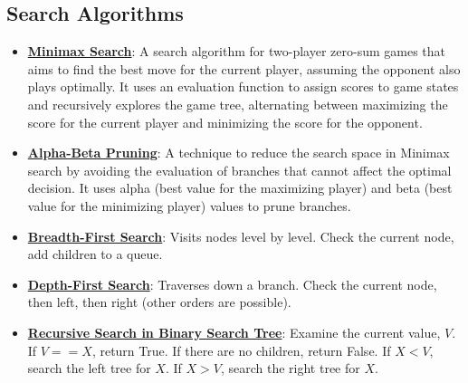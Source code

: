 \documentclass{article}%
\begin{document}
%
\subsection{Search Algorithms}%
\label{subsec:SearchAlgorithms}%
\begin{itemize}[leftmargin=*]%
\item \href{https://purdue.brightspace.com/d2l/common/assets/pdfjs-d2l-dist/1.0.14-legacy/web/viewer.html?file=\%2Fcontent\%2Fenforced\%2F1095467-wl.202510.CS.24300.001\%2F02L2-Intro.pdf\%3Fou\%3D1095467\&lang=en-us\&container=d2l-fileviewer-rendered-pdf\&fullscreen=d2l-fileviewer-rendered-pdf-dialog\&height=667#page=22}{\textbf{Minimax Search}}: A search algorithm for two-player zero-sum games that aims to find the best move for the current player, assuming the opponent also plays optimally. It uses an evaluation function to assign scores to game states and recursively explores the game tree, alternating between maximizing the score for the current player and minimizing the score for the opponent.%
\item \href{https://purdue.brightspace.com/d2l/common/assets/pdfjs-d2l-dist/1.0.14-legacy/web/viewer.html?file=\%2Fcontent\%2Fenforced\%2F1095467-wl.202510.CS.24300.001\%2F02L2-Intro.pdf\%3Fou\%3D1095467\&lang=en-us\&container=d2l-fileviewer-rendered-pdf\&fullscreen=d2l-fileviewer-rendered-pdf-dialog\&height=667#page=23}{\textbf{Alpha-Beta Pruning}}: A technique to reduce the search space in Minimax search by avoiding the evaluation of branches that cannot affect the optimal decision. It uses alpha (best value for the maximizing player) and beta (best value for the minimizing player) values to prune branches.%
\item \href{https://purdue.brightspace.com/d2l/common/assets/pdfjs-d2l-dist/1.0.14-legacy/web/viewer.html?file=\%2Fcontent\%2Fenforced\%2F1095467-wl.202510.CS.24300.001\%2F14L1-DepthFS.pdf\%3Fou\%3D1095467\&lang=en-us\&container=d2l-fileviewer-rendered-pdf\&fullscreen=d2l-fileviewer-rendered-pdf-dialog\&height=667#page=8}{\textbf{Breadth-First Search}}: Visits nodes level by level. Check the current node, add children to a queue.%
\item \href{https://purdue.brightspace.com/d2l/common/assets/pdfjs-d2l-dist/1.0.14-legacy/web/viewer.html?file=\%2Fcontent\%2Fenforced\%2F1095467-wl.202510.CS.24300.001\%2F14L1-DepthFS.pdf\%3Fou\%3D1095467\&lang=en-us\&container=d2l-fileviewer-rendered-pdf\&fullscreen=d2l-fileviewer-rendered-pdf-dialog\&height=667#page=8}{\textbf{Depth-First Search}}: Traverses down a branch. Check the current node, then left, then right (other orders are possible).%
\item \href{https://purdue.brightspace.com/d2l/common/assets/pdfjs-d2l-dist/1.0.14-legacy/web/viewer.html?file=\%2Fcontent\%2Fenforced\%2F1095467-wl.202510.CS.24300.001\%2F14L1-DepthFS.pdf\%3Fou\%3D1095467\&lang=en-us\&container=d2l-fileviewer-rendered-pdf\&fullscreen=d2l-fileviewer-rendered-pdf-dialog\&height=667#page=10}{\textbf{Recursive Search in Binary Search Tree}}: Examine the current value, $V$. If $V == X$, return True. If there are no children, return False. If $X < V$, search the left tree for $X$. If $X > V$, search the right tree for $X$.%
\end{itemize}
\end{document}

